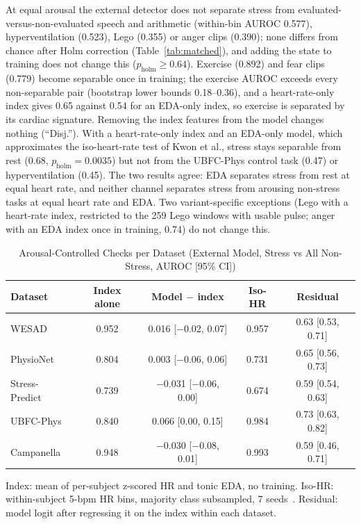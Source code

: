 \documentclass[journal]{IEEEtran}
\newcommand{\m}{$-$}
\begin{document}
At equal arousal the external detector does not separate stress from evaluated-versus-non-evaluated speech and arithmetic (within-bin AUROC 0.577), hyperventilation (0.523), Lego (0.355) or anger clips (0.390); none differs from chance after Holm correction (Table~\ref{tab:matched}), and adding the state to training does not change this ($p_{\mathrm{holm}}\ge0.64$). Exercise (0.892) and fear clips (0.779) become separable once in training; the exercise AUROC exceeds every non-separable pair (bootstrap lower bounds 0.18--0.36), and a heart-rate-only index gives 0.65 against 0.54 for an EDA-only index, so exercise is separated by its cardiac signature. Removing the index features from the model changes nothing (``Disj.''). With a heart-rate-only index and an EDA-only model, which approximates the iso-heart-rate test of Kwon et al., stress stays separable from rest (0.68, $p_{\mathrm{holm}}=0.0035$) but not from the UBFC-Phys control task (0.47) or hyperventilation (0.45). The two results agree: EDA separates stress from rest at equal heart rate, and neither channel separates stress from arousing non-stress tasks at equal heart rate and EDA. Two variant-specific exceptions (Lego with a heart-rate index, restricted to the 259 Lego windows with usable pulse; anger with an EDA index once in training, 0.74) do not change this.

\begin{table}[!t]
\centering
\caption{Arousal-Controlled Checks per Dataset (External Model, Stress vs All Non-Stress, AUROC [95\% CI])}
\label{tab:kit}
\scriptsize
\begin{tabularx}{\columnwidth}{@{}Lcccc@{}}
\toprule
Dataset & Index alone & Model $-$ index & Iso-HR & Residual \\
\midrule
WESAD & 0.952 & 0.016 [\m0.02, 0.07] & 0.957 & 0.63 [0.53, 0.71] \\
PhysioNet & 0.804 & 0.003 [\m0.06, 0.06] & 0.731 & 0.65 [0.56, 0.73] \\
Stress-Predict & 0.739 & \m0.031 [\m0.06, 0.00] & 0.674 & 0.59 [0.54, 0.63] \\
UBFC-Phys & 0.840 & 0.066 [0.00, 0.15] & 0.984 & 0.73 [0.63, 0.82] \\
Campanella & 0.948 & \m0.030 [\m0.08, 0.01] & 0.993 & 0.59 [0.46, 0.71] \\
\bottomrule
\end{tabularx}
\par\vspace{2pt}\raggedright\scriptsize Index: mean of per-subject z-scored HR and tonic EDA, no training. Iso-HR: within-subject 5-bpm HR bins, majority class subsampled, 7 seeds~\cite{kwon2026}. Residual: model logit after regressing it on the index within each dataset.
\end{table}
\end{document}
